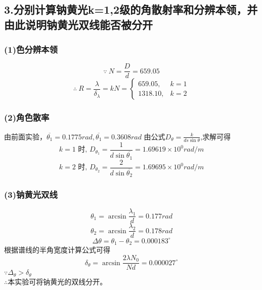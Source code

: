 \documentclass[11pt,a4paper,oneside]{article}
\begin{document}
\subsection*{3.分别计算钠黄光k=1,2级的角散射率和分辨本领，并由此说明钠黄光双线能否被分开}
\subsubsection*{(1)色分辨本领}
$$\because\ N = \displaystyle\frac{D}{d} = 659.05$$
$$\therefore\ R = \displaystyle\frac{\lambda}{ {\delta}_{\lambda}} = kN = \begin{cases} 659.05, & k=1 \\ 1318.10 ,& k=2 \end{cases} $$
\subsubsection*{(2)角色散率}
由前面实验，$ \overline{ {\theta}_1} = 0.1775rad, \overline{ {\theta}_1} = 0.3608rad$
由公式$D_{\theta} = \displaystyle\frac{k}{ds\sin{\theta}}$,求解可得\\
$$k=1\text{ \ 时,\ } D_{ {\theta}_1} = \displaystyle\frac{1}{d\sin{\overline{ {\theta}_1}}} = 1.69619{\times}10^{0}rad/m$$
$$k=2\text{ \ 时,\ } D_{ {\theta}_2} = \displaystyle\frac{2}{d\sin{\overline{ {\theta}_2}}} = 1.69695{\times}10^{0}rad/m$$
\subsubsection*{(3)钠黄光双线}
$${\theta}_1 = \arcsin{\frac{ {\lambda}_1}{d}} = 0.177rad$$
$${\theta}_2 = \arcsin{\frac{ {\lambda}_2}{d}} = 0.178rad$$
$$\Delta{\theta} = {\theta}_1 - {\theta}_2 = 0.000183^{\circ}$$
根据谱线的半角宽度计算公式可得
$${\delta}_{\theta} = \arcsin{\frac{2\lambda N_0}{Nd}} = 0.000027^{\circ}$$
$\because {\Delta}_{\theta} > {\delta}_{\theta} $ \\
$\therefore$本实验可将钠黄光的双线分开。
\end{document}

